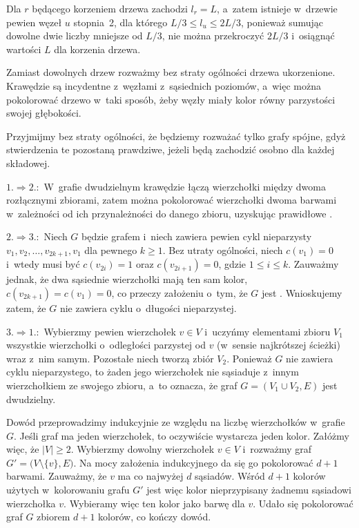 Dla $r$ będącego korzeniem drzewa zachodzi $l_r=L$, a~zatem istnieje w~drzewie pewien węzeł $u$ stopnia~2, dla którego $L/3\le l_u\le 2L/3$, ponieważ sumując dowolne dwie liczby mniejsze od $L/3$, nie można przekroczyć $2L/3$ i~osiągnąć wartości $L$ dla korzenia drzewa.

\problems


\subproblem %
Zamiast dowolnych drzew rozważmy bez straty ogólności drzewa ukorzenione. Krawędzie są incydentne z~węzłami z~sąsiednich poziomów, a~więc można pokolorować drzewo w~taki sposób, żeby węzły miały kolor równy parzystości swojej głębokości.

\subproblem %
Przyjmijmy bez straty ogólności, że będziemy rozważać tylko grafy spójne, gdyż stwierdzenia te pozostaną prawdziwe, jeżeli będą zachodzić osobno dla każdej składowej.
\bigskip

$1.\Rightarrow 2.\!\!:$ W~grafie dwudzielnym krawędzie łączą wierzchołki między dwoma rozłącznymi zbiorami, zatem można pokolorować wierzchołki dwoma barwami w~zależności od ich przynależności do danego zbioru, uzyskując prawidłowe .
\bigskip

$2.\Rightarrow 3.\!\!:$ Niech $G$ będzie grafem  i~niech zawiera pewien cykl nieparzysty $v_1,v_2,\dots,v_{2k+1},v_1$ dla pewnego $k\ge1$. Bez utraty ogólności, niech $c(v_1)=0$ i~wtedy musi być $c(v_{2i})=1$ oraz $c(v_{2i+1})=0$, gdzie $1\le i\le k$. Zauważmy jednak, że dwa sąsiednie wierzchołki mają ten sam kolor, $c(v_{2k+1})=c(v_1)=0$, co przeczy założeniu o~tym, że $G$ jest . Wnioskujemy zatem, że $G$ nie zawiera cyklu o~długości nieparzystej.
\bigskip

$3.\Rightarrow 1.\!\!:$ Wybierzmy pewien wierzchołek $v\in V$ i~uczyńmy elementami zbioru $V_1$ wszystkie wierzchołki o~odległości parzystej od $v$ (w~sensie najkrótszej ścieżki) wraz z~nim samym. Pozostałe niech tworzą zbiór $V_2$. Ponieważ $G$ nie zawiera cyklu nieparzystego, to żaden jego wierzchołek nie sąsiaduje z~innym wierzchołkiem ze swojego zbioru, a~to oznacza, że graf $G=(V_1\cup V_2,E)$ jest dwudzielny.

\subproblem %
Dowód przeprowadzimy indukcyjnie ze względu na liczbę wierzchołków w~grafie $G$. Jeśli graf ma jeden wierzchołek, to oczywiście wystarcza jeden kolor. Załóżmy więc, że $|V|\ge2$. Wybierzmy dowolny wierzchołek $v\in V$ i~rozważmy graf $G'=\bigl(V\setminus\{v\},E\bigr)$. Na mocy założenia indukcyjnego da się go pokolorować $d+1$ barwami. Zauważmy, że $v$ ma co najwyżej $d$ sąsiadów. Wśród $d+1$ kolorów użytych w~kolorowaniu grafu $G'$ jest więc kolor nieprzypisany żadnemu sąsiadowi wierzchołka $v$. Wybieramy więc ten kolor jako barwę dla $v$. Udało się pokolorować graf $G$ zbiorem $d+1$ kolorów, co kończy dowód.

